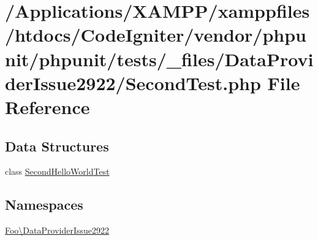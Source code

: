 \hypertarget{_data_provider_issue2922_2_second_test_8php}{}\section{/\+Applications/\+X\+A\+M\+P\+P/xamppfiles/htdocs/\+Code\+Igniter/vendor/phpunit/phpunit/tests/\+\_\+files/\+Data\+Provider\+Issue2922/\+Second\+Test.php File Reference}
\label{_data_provider_issue2922_2_second_test_8php}
\subsection*{Data Structures}
\begin{DoxyCompactItemize}
\item 
class \mbox{\hyperlink{class_foo_1_1_data_provider_issue2922_1_1_second_hello_world_test}{Second\+Hello\+World\+Test}}
\end{DoxyCompactItemize}
\subsection*{Namespaces}
\begin{DoxyCompactItemize}
\item 
 \mbox{\hyperlink{namespace_foo_1_1_data_provider_issue2922}{Foo\textbackslash{}\+Data\+Provider\+Issue2922}}
\end{DoxyCompactItemize}
